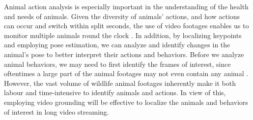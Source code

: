 \documentclass[10pt,twocolumn,letterpaper]{article}
\begin{document}
    Animal action analysis is especially important in the understanding of the health and needs of animals. Given the diversity of animals’ actions, and how actions can occur and switch within split seconds, the use of video footages enables us to monitor multiple animals round the clock \cite{ANDERSON201418}. In addition, by localizing keypoints and employing pose estimation, we can analyze and identify changes in the animal's pose to better interpret their actions and behaviors. Before we analyze animal behaviors, we may need to first identify the frames of interest, since oftentimes a large part of the animal footages may not even contain any animal \cite{9522940, miao2021serengeti}. However, the vast volume of wildlife animal footages inherently make it both labour and time-intensive to identify animals and actions. In view of this, employing video grounding \cite{zhang2020span, mun2020LGI} will be effective to localize the animals and behaviors of interest in long video streaming.
    
\end{document}
